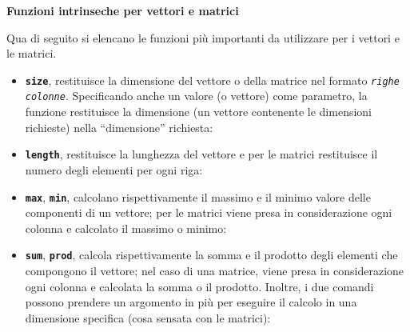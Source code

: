 \documentclass[a4paper]{article}
\newcommand{\dquotes}[1]{``#1''}
\begin{document}
    \begin{flushleft}
        \large
        \textcolor{Red3}{\textbf{Funzioni intrinseche per vettori e matrici}}
    \end{flushleft}
    Qua di seguito si elencano le funzioni più importanti da utilizzare per i vettori e le matrici.
    \begin{itemize}
        \item \texttt{\textbf{size}}, restituisce la dimensione del vettore o della matrice nel formato \texttt{\emph{righe} \emph{colonne}}. Specificando anche un valore (o vettore) come parametro, la funzione restituisce la dimensione (un vettore contenente le dimensioni richieste) nella \dquotes{dimensione} richiesta:
        

        \item \texttt{\textbf{length}}, restituisce la lunghezza del vettore e per le matrici restituisce il numero degli elementi per ogni riga:
        

        \item \texttt{\textbf{max}}, \texttt{\textbf{min}}, calcolano rispettivamente il massimo e il minimo valore delle componenti di un vettore; per le matrici viene presa in considerazione ogni colonna e calcolato il massimo o minimo:
        

        \item \texttt{\textbf{sum}}, \texttt{\textbf{prod}}, calcola rispettivamente la somma e il prodotto degli elementi che compongono il vettore; nel caso di una matrice, viene presa in considerazione ogni colonna e calcolata la somma o il prodotto. Inoltre, i due comandi possono prendere un argomento in più per eseguire il calcolo in una dimensione specifica (cosa sensata con le matrici):
        


\end{itemize}
\end{document}
